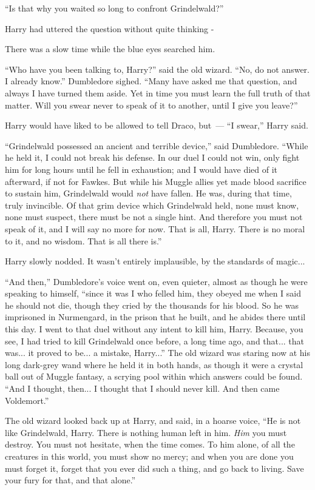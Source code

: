 ``Is that why you waited so long to confront Grindelwald?''

Harry had uttered the question without quite thinking -

There was a slow time while the blue eyes searched him.

``Who have you been talking to, Harry?'' said the old wizard. ``No, do not answer. I already know.'' Dumbledore sighed. ``Many have asked me that question, and always I have turned them aside. Yet in time you must learn the full truth of that matter. Will you swear never to speak of it to another, until I give you leave?''

Harry would have liked to be allowed to tell Draco, but~--- ``I swear,'' Harry said.

``Grindelwald possessed an ancient and terrible device,'' said Dumbledore. ``While he held it, I could not break his defense. In our duel I could not win, only fight him for long hours until he fell in exhaustion; and I would have died of it afterward, if not for Fawkes. But while his Muggle allies yet made blood sacrifice to sustain him, Grindelwald would \emph{not} have fallen. He was, during that time, truly invincible. Of that grim device which Grindelwald held, none must know, none must suspect, there must be not a single hint. And therefore you must not speak of it, and I will say no more for now. That is all, Harry. There is no moral to it, and no wisdom. That is all there is.''

Harry slowly nodded. It wasn't entirely implausible, by the standards of magic...

``And then,'' Dumbledore's voice went on, even quieter, almost as though he were speaking to himself, ``since it was I who felled him, they obeyed me when I said he should not die, though they cried by the thousands for his blood. So he was imprisoned in Nurmengard, in the prison that he built, and he abides there until this day. I went to that duel without any intent to kill him, Harry. Because, you see, I had tried to kill Grindelwald once before, a long time ago, and that... that was... it proved to be... a mistake, Harry...'' The old wizard was staring now at his long dark-grey wand where he held it in both hands, as though it were a crystal ball out of Muggle fantasy, a scrying pool within which answers could be found. ``And I thought, then... I thought that I should never kill. And then came Voldemort.''

The old wizard looked back up at Harry, and said, in a hoarse voice, ``He is not like Grindelwald, Harry. There is nothing human left in him. \emph{Him} you must destroy. You must not hesitate, when the time comes. To him alone, of all the creatures in this world, you must show no mercy; and when you are done you must forget it, forget that you ever did such a thing, and go back to living. Save your fury for that, and that alone.''

